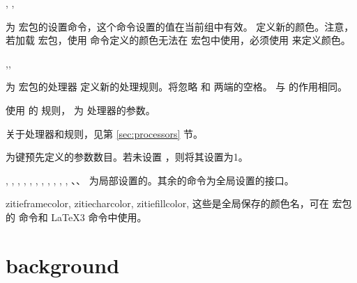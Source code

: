 \documentclass{ctxdoc}
\begin{document}
\begin{function}{
  \zitiesetup,
  \zitiecolorlet,
}
  \begin{syntax}
     
       
  \end{syntax}
   为  宏包的设置命令，这个命令设置的值在当前组中有效。 定义新的颜色。注意，若加载  宏包，使用  命令定义的颜色无法在  宏包中使用，必须使用  来定义颜色。
\end{function}

\begin{function}{\zitienewprocessorrule,\zitienewrule,\zitieuseprocessorrule}
  \begin{syntax}
        
        
  \end{syntax}
   为  宏包的处理器  定义新的处理规则。将忽略  和  两端的空格。
   与  的作用相同。
  
   使用  的  规则， 为  处理器的参数。

  关于处理器和规则，见第 \ref{sec:processors} 节。

   为键预先定义的参数数目。若未设置 ，则将其设置为1。
\end{function}

\begin{function}{
  \zitiebasechar,
  \zitiebasecharwidth,
  \zitiebasecharheight,
  \zitiewidth,
  \zitieheight,
  \zitieboxwd,
  \zitieboxht,
  \zitieboxdp,
  \zitiefontname,
  \zitiexscaleratio,
  \zitieyscaleratio,
}
  、、 为局部设置的。其余的命令为全局设置的接口。
\end{function}

\begin{function}{
  zitieframecolor,
  zitiecharcolor,
  zitiefillcolor,
}
  这些是全局保存的颜色名，可在  宏包的  命令和 \LaTeX3  命令中使用。
\end{function}


\section{background}\label{sec:background}
\end{document}
